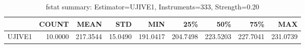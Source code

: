 \begin{table}[ht]
\centering
\caption{fstat summary: Estimator=UJIVE1, Instruments=333, Strength=0.20}
\begin{tabular}{lrrrrrrrr}
\toprule
 & COUNT & MEAN & STD & MIN & 25\% & 50\% & 75\% & MAX \\
\midrule
UJIVE1 & 10.0000 & 217.3544 & 15.0490 & 191.0417 & 204.7498 & 223.5203 & 227.7041 & 231.0739 \\
\bottomrule
\end{tabular}
\end{table}
